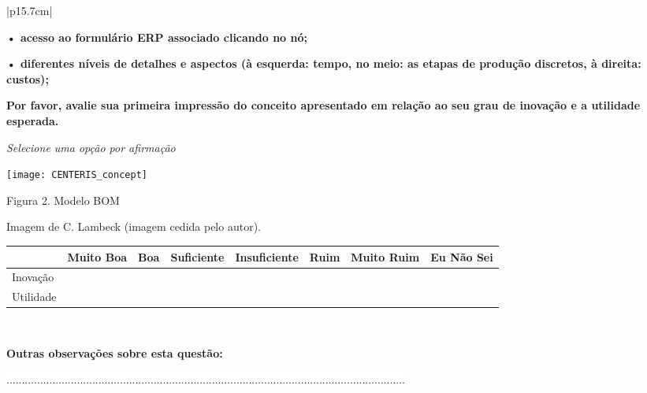 \begin{longtable}{|p{15.7cm}|}
\begin{Spacing}{1.4}
		\textbf{• acesso ao formulário ERP associado clicando no nó;} \end{Spacing} 	
	\begin{Spacing}{1.4} 
		\textbf{• diferentes níveis de detalhes e aspectos (à esquerda: tempo, no meio: as etapas de produção discretos, à direita: custos);} \end{Spacing} 	
	\begin{Spacing}{1.4} 
		\textbf{Por favor, avalie sua primeira impressão do conceito apresentado em relação ao seu grau de inovação e a utilidade esperada.} \end{Spacing} 	
	\begin{Spacing}{1.4} 
	\tiny \textit{Selecione uma opção por afirmação} \end{Spacing} 
	\begin{Spacing}{2.5} 
	\parbox[c]{1em}{\texttt{[image: CENTERIS\_concept]}} 
	\end{Spacing} 
	\begin{Spacing}{1.2} 
		\hspace{6} Figura 2. Modelo BOM 
	\end{Spacing}
	\tiny \hspace{6} Imagem de C. Lambeck (imagem cedida pelo autor). \\
	\tiny \begin{tabularx}{15.7 cm}{|X|X|X|X|X|X|X|X|}
	\hline
	          & Muito Boa & Boa  & Suficiente & Insuficiente & Ruim & Muito Ruim & Eu Não Sei\\
	\hline
	Inovação  &   &   &   &   &  &  &  \\
		\hline
	Utilidade &   &   &   &   &  &  &  \\
		\hline
	\end{tabularx} \\
	\begin{Spacing}{1.0} \end{Spacing}
	\begin{Spacing}{0.8} 
		\textbf{Outras observações sobre esta questão:} \end{Spacing} 
	\begin{Spacing}{2.5} \end{Spacing} 
	\colorbox{white}{ .................................................................................................................................. } \\

\end{longtable}

